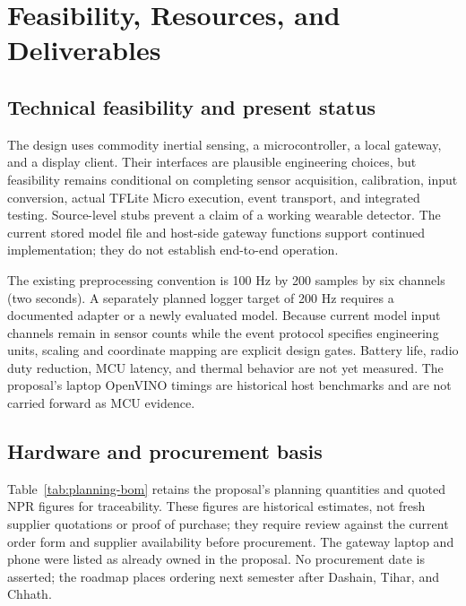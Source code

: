 \chapter{Feasibility, Resources, and Deliverables}
\label{ch:feasibility}

\section{Technical feasibility and present status}
The design uses commodity inertial sensing, a microcontroller, a local gateway, and a display client. Their interfaces are plausible engineering choices, but feasibility remains conditional on completing sensor acquisition, calibration, input conversion, actual TFLite Micro execution, event transport, and integrated testing. Source-level stubs prevent a claim of a working wearable detector. The current stored model file and host-side gateway functions support continued implementation; they do not establish end-to-end operation.

The existing preprocessing convention is 100 Hz by 200 samples by six channels (two seconds). A separately planned logger target of 200 Hz requires a documented adapter or a newly evaluated model. Because current model input channels remain in sensor counts while the event protocol specifies engineering units, scaling and coordinate mapping are explicit design gates. Battery life, radio duty reduction, MCU latency, and thermal behavior are not yet measured. The proposal's laptop OpenVINO timings are historical host benchmarks and are not carried forward as MCU evidence.

\section{Hardware and procurement basis}
Table~\ref{tab:planning-bom} retains the proposal's planning quantities and quoted NPR figures for traceability. These figures are historical estimates, not fresh supplier quotations or proof of purchase; they require review against the current order form and supplier availability before procurement. The gateway laptop and phone were listed as already owned in the proposal. No procurement date is asserted; the roadmap places ordering next semester after Dashain, Tihar, and Chhath.

